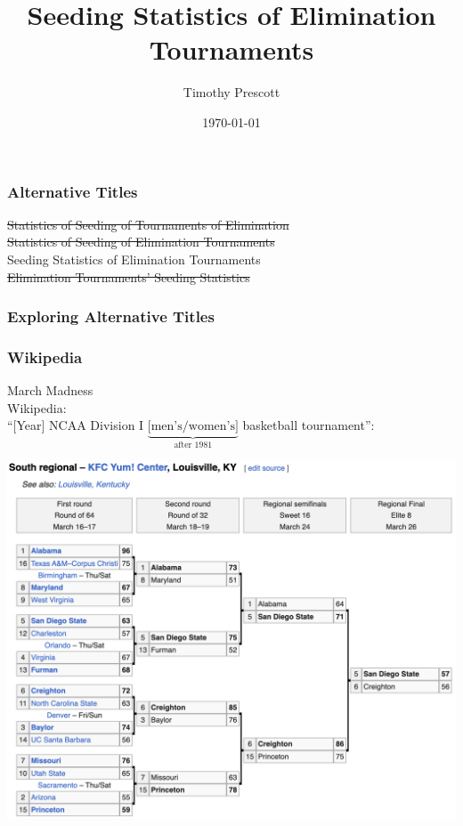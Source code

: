 \documentclass{beamer}
\title{Seeding Statistics of Elimination Tournaments}
\author{Timothy Prescott}
\date{\today}
\begin{document}
\begin{frame}
\maketitle
\end{frame}

\begin{frame}
\frametitle{Alternative Titles}
\begin{center}\Large\color{blue}
\sout{Statistics of Seeding of Tournaments of Elimination}\\
\sout{Statistics of Seeding of Elimination Tournaments}\\
Seeding Statistics of Elimination Tournaments\\
\sout{Elimination Tournaments' Seeding Statistics}
\end{center}
\end{frame}

\begin{frame}
\frametitle{Exploring Alternative Titles}\centering
{}
\end{frame}

\begin{frame}
\frametitle{Wikipedia}
March Madness\\
Wikipedia:\\
``[Year] NCAA Division I $\underbrace{\text{[men's/women's]}}_{\text{after 1981}}$ basketball tournament'':
\end{frame}

\begin{frame}
\includegraphics[width=\linewidth]{../paper/2023bracket}
\end{frame}
\end{document}
